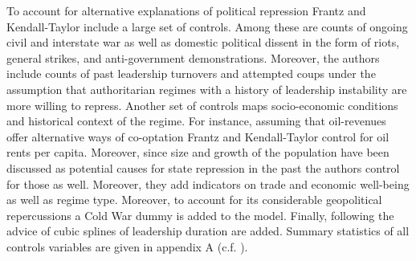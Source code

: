 To account for alternative explanations of political 
repression Frantz and Kendall-Taylor include a large set
of controls. Among these are counts of ongoing civil and 
interstate war as well as domestic political dissent in the 
form of riots, general strikes, and anti-government 
demonstrations. Moreover, the authors include counts of past
leadership turnovers and attempted coups under the assumption 
that authoritarian regimes with a history of leadership 
instability are more willing to repress. Another set of 
controls maps socio-economic conditions and historical 
context of the regime. For instance, assuming that 
oil-revenues offer alternative ways of co-optation Frantz 
and Kendall-Taylor control for oil rents per capita. 
Moreover, since size and growth of the population have been 
discussed as potential causes for state repression in the 
past the authors control for those as well. Moreover, they
add indicators on trade and economic well-being as well as
regime type. Moreover, to account for its considerable 
geopolitical repercussions a Cold War dummy is added to the 
model. Finally, following the advice of \citet{Carter.2010} 
cubic splines of leadership duration are added. Summary 
statistics of all controls variables are given in appendix A
(c.f. \cite[338f.]{Frantz.2014}).